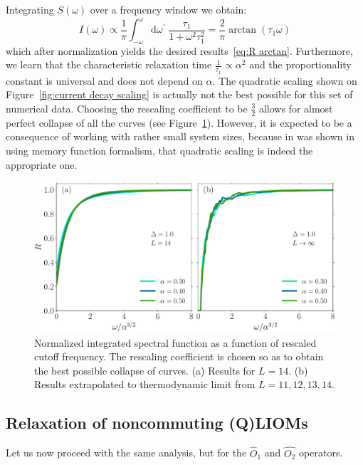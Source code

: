 Integrating \(S(\omega)\) over a frequency window we obtain:
\begin{equation*}
  I(\omega) \propto \frac{1}{\pi}\int_{-\omega}^{\omega}\mathrm{d}\omega^{\prime}\; 
  \frac{\tau_1}{1+\omega^2\tau_1^2} = \frac{2}{\pi} \arctan(\tau_1 \omega)
\end{equation*}
which after normalization yields the desired results~\eqref{eq:R arctan}. Furthermore, we learn that the 
characteristic relaxation time \(\frac{1}{\tau_1} \propto \alpha^2\) and the proportionality
constant is universal and does not depend on \(\alpha\).
The quadratic scaling shown on Figure~\ref{fig:current decay scaling} is actually not the
best possible for this set of numerical data. Choosing the rescaling coefficient to be
\(\frac{3}{2}\) allows for almost perfect collapse of all the curves 
(see Figure~\ref{fig:current decay perfect scaling}). However, it is expected to be a consequence
of working with rather small system sizes, because in was shown 
in~\textcite{Mierzejewski2015Approx} using memory function formalism, that quadratic scaling
is indeed the appropriate one.
\begin{figure}[htbp]
  \centering
  \includegraphics[width=1.0\textwidth]{Figures/current_perfect_scaling.pdf}
  \caption{Normalized integrated spectral function as a function of 
  rescaled cutoff frequency. The rescaling coefficient is chosen so as to obtain the 
  best possible collapse of curves. (a) Results for \(L=14\). (b) Results extrapolated
   to thermodynamic limit from \(L=11,12,13,14\).}\label{fig:current decay perfect scaling}
\end{figure}



\subsection{Relaxation of noncommuting (Q)LIOMs}
Let us now proceed with the same analysis, but for the \(\hat{O}_1\) and \(\hat{O_2}\)
operators.

